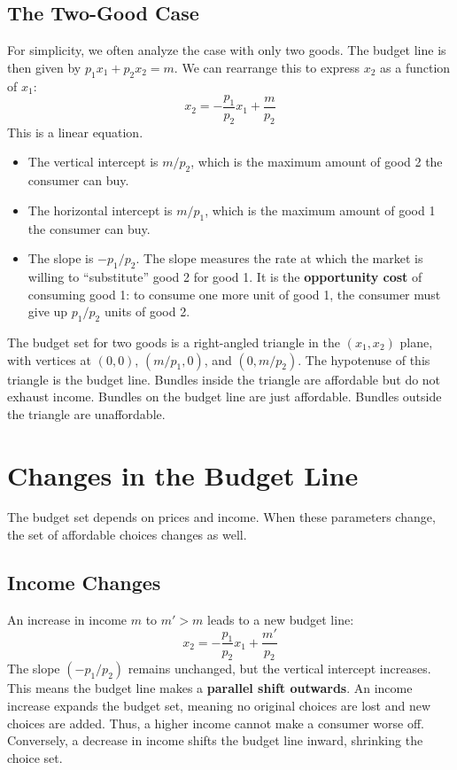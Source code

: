 \subsection{The Two-Good Case}

For simplicity, we often analyze the case with only two goods. The budget line is then given by $p_1x_1 + p_2x_2 = m$. We can rearrange this to express $x_2$ as a function of $x_1$:
\begin{equation}
    x_2 = -\frac{p_1}{p_2}x_1 + \frac{m}{p_2}
\end{equation}
This is a linear equation.
\begin{itemize}
    \item The vertical intercept is $m/p_2$, which is the maximum amount of good 2 the consumer can buy.
    \item The horizontal intercept is $m/p_1$, which is the maximum amount of good 1 the consumer can buy.
    \item The slope is $-p_1/p_2$. The slope measures the rate at which the market is willing to ``substitute'' good 2 for good 1. It is the \textbf{opportunity cost} of consuming good 1: to consume one more unit of good 1, the consumer must give up $p_1/p_2$ units of good 2.
\end{itemize}

\begin{remark}
The budget set for two goods is a right-angled triangle in the $(x_1, x_2)$ plane, with vertices at $(0,0)$, $(m/p_1, 0)$, and $(0, m/p_2)$. The hypotenuse of this triangle is the budget line. Bundles inside the triangle are affordable but do not exhaust income. Bundles on the budget line are just affordable. Bundles outside the triangle are unaffordable.
\end{remark}

\section{Changes in the Budget Line}

The budget set depends on prices and income. When these parameters change, the set of affordable choices changes as well.

\subsection{Income Changes}
An increase in income $m$ to $m' > m$ leads to a new budget line:
\[ x_2 = -\frac{p_1}{p_2}x_1 + \frac{m'}{p_2} \]
The slope $(-p_1/p_2)$ remains unchanged, but the vertical intercept increases. This means the budget line makes a \textbf{parallel shift outwards}. An income increase expands the budget set, meaning no original choices are lost and new choices are added. Thus, a higher income cannot make a consumer worse off. Conversely, a decrease in income shifts the budget line inward, shrinking the choice set.

